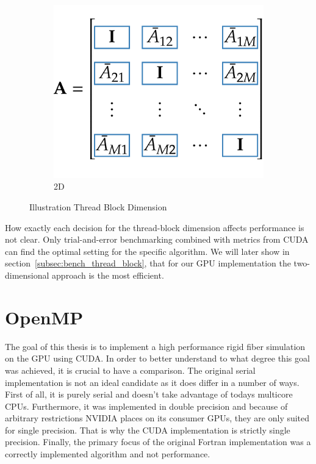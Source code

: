 \documentclass[a4paper,11pt]{kth-mag}
\begin{document}
\begin{figure}[!htbp]
\begin{subfigure}[h]{0.33\textwidth}
    \includegraphics[width=\textwidth]{img/thread_block2D.pdf}
    \caption{2D}\label{fig:thread_block_2D}
  \end{subfigure}
  \caption{Illustration Thread Block Dimension}
  \label{fig:thread_block}
\end{figure}

How exactly each decision for the thread-block dimension affects performance is not clear. Only trial-and-error benchmarking combined with metrics from CUDA can find the optimal setting for the specific algorithm. We will later show in section~\ref{subsec:bench_thread_block}, that for our GPU implementation the two-dimensional approach is the most efficient.

\section{OpenMP}

The goal of this thesis is to implement a high performance rigid fiber simulation on the GPU using CUDA. In order to better understand to what degree this goal was achieved, it is crucial to have a comparison. The original serial implementation is not an ideal candidate as it does differ in a number of ways. First of all, it is purely serial and doesn't take advantage of todays multicore CPUs. Furthermore, it was implemented in double precision and because of arbitrary restrictions NVIDIA places on its consumer GPUs, they are only suited for single precision. That is why the CUDA implementation is strictly single precision. Finally, the primary focus of the original Fortran implementation was a correctly implemented algorithm and not performance.
\end{document}
